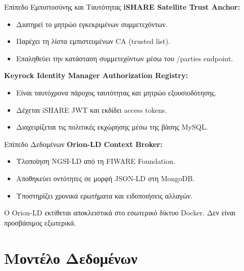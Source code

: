 \documentclass[11pt]{beamer}
\newcommand{\en}[1]{\foreignlanguage{english}{#1}}
\begin{document}
\begin{frame}{Επίπεδο Εμπιστοσύνης και Ταυτότητας}
\textbf{\en{iSHARE Satellite} \en{Trust Anchor}:}
\begin{itemize}
    \item Διατηρεί το μητρώο εγκεκριμένων συμμετεχόντων.
    \item Παρέχει τη λίστα εμπιστευμένων \en{CA} (\textlatin{trusted list}).
    \item Επαληθεύει την κατάσταση συμμετεχόντων μέσω του
    \textlatin{/parties} \en{endpoint}.
\end{itemize}
\bigskip

\textbf{\en{Keyrock Identity Manager} \en{Authorization Registry}:}
\begin{itemize}
    \item Είναι ταυτόχρονα πάροχος ταυτότητας \textit{και} μητρώο
    εξουσιοδότησης.
    \item Δέχεται \en{iSHARE JWT} και εκδίδει \en{access tokens}.
    \item Διαχειρίζεται τις πολιτικές εκχώρησης μέσω της βάσης
    \en{MySQL}.
\end{itemize}
\end{frame}

\begin{frame}{Επίπεδο Δεδομένων}
\textbf{\en{Orion-LD Context Broker}:}
\begin{itemize}
    \item Υλοποίηση \en{NGSI-LD} από τη \en{FIWARE Foundation}.
    \item Αποθηκεύει οντότητες σε μορφή \en{JSON-LD} στη
    \en{MongoDB}.
    \item Υποστηρίζει χρονικά ερωτήματα και ειδοποιήσεις αλλαγών.
\end{itemize}
\bigskip

Ο \en{Orion-LD} εκτίθεται αποκλειστικά στο εσωτερικό δίκτυο \en{Docker}.
Δεν είναι προσβάσιμος εξωτερικά.
\end{frame}

\section{Μοντέλο Δεδομένων}
\end{document}
